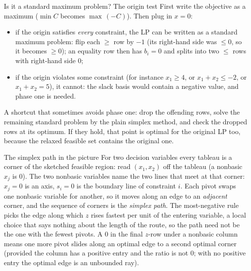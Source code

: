 \begin{rulebox}{Is it a standard maximum problem? The origin test}
First write the objective as a maximum ($\min C$ becomes $\max\,(-C)$).
Then plug in $x=0$:
\begin{itemize}[leftmargin=1.6em,itemsep=0.3ex]
  \item if the origin satisfies \emph{every} constraint, the LP can be
        written as a standard maximum problem: flip each $\ge$ row by
        $-1$ (its right-hand side was $\le 0$, so it becomes $\ge 0$); an
        equality row then has $b_i=0$ and splits into two $\le$ rows with
        right-hand side $0$;
  \item if the origin violates some constraint (for instance
        $x_1\ge 4$, or $x_1+x_2\le -2$, or $x_1+x_2=5$), it cannot: the
        slack basis would contain a negative value, and phase one is
        needed.
\end{itemize}
A shortcut that sometimes avoids phase one: drop the offending rows, solve
the remaining standard problem by the plain simplex method, and check the
dropped rows at its optimum. If they hold, that point is optimal for the
original LP too, because the relaxed feasible set contains the original one.
\end{rulebox}

\begin{rulebox}{The simplex path in the picture}
For two decision variables every tableau is a corner of the sketched
feasible region: read $(x_1,x_2)$ off the tableau (a nonbasic $x_j$ is $0$).
The two nonbasic variables name the two lines that meet at that corner:
$x_j=0$ is an axis, $s_i=0$ is the boundary line of constraint $i$. Each
pivot swaps one nonbasic variable for another, so it moves along an edge
to an \emph{adjacent} corner, and the sequence of corners is the
\emph{simplex path}. The most-negative rule picks the edge along which $z$
rises fastest per unit of the entering variable, a local choice that says
nothing about the length of the route, so the path need not be the one
with the fewest pivots. A $0$ in the final $z$-row under a nonbasic column
means one more pivot slides along an optimal edge to a second optimal
corner (provided the column has a positive entry and the ratio is not
$0$; with no positive entry the optimal edge is an unbounded ray).
\end{rulebox}

